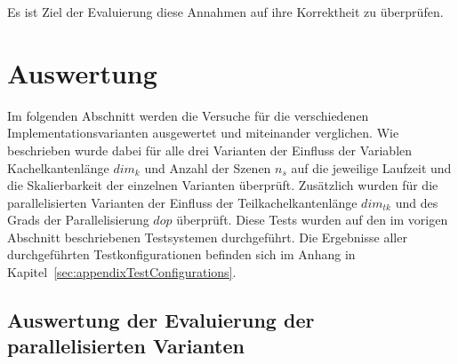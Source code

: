 Es ist Ziel der Evaluierung diese Annahmen auf ihre Korrektheit zu überprüfen.


\section{Auswertung}
Im folgenden Abschnitt werden die Versuche für die verschiedenen Implementationsvarianten ausgewertet und miteinander verglichen. Wie beschrieben wurde dabei für alle drei Varianten der Einfluss der Variablen Kachelkantenlänge $dim_k$ und Anzahl der Szenen $n_s$ auf die jeweilige Laufzeit und die Skalierbarkeit der einzelnen Varianten überprüft. Zusätzlich wurden für die parallelisierten Varianten der Einfluss der Teilkachelkantenlänge $dim_{tk}$ und des Grads der Parallelisierung $dop$ überprüft. Diese Tests wurden auf den im vorigen Abschnitt beschriebenen Testsystemen durchgeführt. Die Ergebnisse aller durchgeführten Testkonfigurationen befinden sich im Anhang in Kapitel~\ref{sec:appendixTestConfigurations}.

\subsection{Auswertung der Evaluierung der parallelisierten Varianten}
